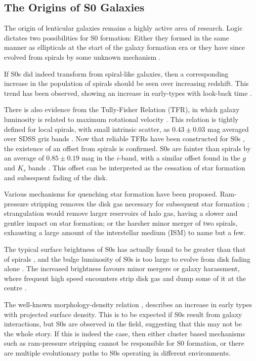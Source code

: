 \subsection{The Origins of S0 Galaxies}
The origin of lenticular galaxies remains a highly active area of research. Logic dictates two possibilities for S0 formation: Either they formed in the same manner as ellipticals at the start of the galaxy formation era or they have since evolved from spirals by some unknown mechanism \citep{burstein_k-band_2005}.

If S0s did indeed transform from spiral-like galaxies, then a corresponding increase in the population of spirals should be seen over increasing redshift. This trend has been observed, showing an increase in early-types with look-back time \citep{dressler_evolution_1997}.

There is also evidence from the Tully-Fisher Relation (TFR), in which galaxy luminosity is related to maximum rotational velocity \citep{tully_new_1977}. This relation is tightly defined for local spirals, with small intrinsic scatter, as $0.43 \pm 0.03$ mag averaged over SDSS griz bands \citep{pizagno_tully-fisher_2007}. Now that reliable TFRs have been constructed for S0s \citep{bedregal_tullyfisher_2006}, the existence of an offset from spirals is confirmed. S0s are fainter than spirals by an average of $0.85 \pm 0.19$ mag in the $i$-band, with a similar offset found in the $g$ and $K_s$ bands \citep{rawle_s0_2013}. This offset can be interpreted as the cessation of star formation and subsequent fading of the disk.

Various mechanisms for quenching star formation have been proposed. Ram-pressure stripping removes the disk gas necessary for subsequent star formation \citep{gunn_infall_1972}; strangulation would remove larger reservoirs of halo gas, having a slower and gentler impact on star formation; or the harsher minor merger of two spirals, exhausting a large amount of the interstellar medium (ISM)  \citep{bekki_unequal-mass_1998} to name but a few.

The typical surface brightness of S0s has actually found to be greater than that of spirals \citep{burstein_k-band_2005}, and the bulge luminosity of S0s is too large to evolve from disk fading alone \citep{cortesi_planetary_2013}. The increased brightness favours minor mergers or galaxy harassment, where frequent high speed encounters strip disk gas and dump some of it at the centre \citep{moore_galaxy_1996}.

The well-known morphology-density relation \citep{dressler_galaxy_1980}, describes an increase in early types with projected surface density. This is to be expected if S0s result from galaxy interactions, but S0s are observed in the field, suggesting that this may not be the whole story. If this is indeed the case, then either cluster based mechanisms such as ram-pressure stripping cannot be responsible for S0 formation, or there are multiple evolutionary paths to S0s operating in different environments. 

